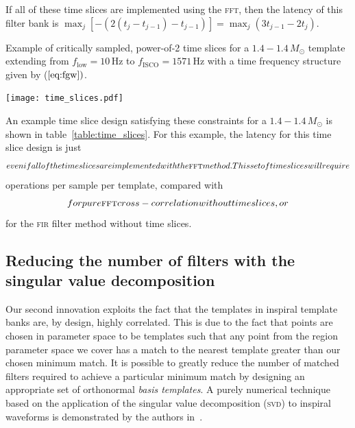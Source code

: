 If all of these time slices are implemented using the \textsc{fft}, then the
latency of this filter bank is $\max_j {\left[-\left( 2(t_j - t_{j-1}) -
t_{j-1} \right)\right]} = \max_j \left( 3 t_{j-1} - 2 t_j \right)$.

\begin{table}[h!]
\caption{Example of critically sampled, power-of-2 time slices for a $1.4 - 1.4
\, M_{\odot}$ template extending from $f_\mathrm{low} = 10 \, \mathrm{Hz}$ to
$f_\mathrm{ISCO} = 1571\, \mathrm{Hz}$ with a time frequency structure given by
($\ref{eq:fgw})$.}
\label{table:time_slices}
\begin{minipage}[c]{0.5\textwidth}
\centering
\texttt{[image: time\_slices.pdf]}
\end{minipage}
\begin{minipage}[c]{0.3\textwidth}
\centering

\end{minipage}
\end{table}

An example time slice design satisfying these constraints for a $1.4 - 1.4 \,
M_{\odot}$ is shown in table~\ref{table:time_slices}.  For this example, the
latency for this time slice design is just $$
even if all of the time slices are implemented with the \textsc{fft} method.
This set of time slices will require $$
operations per sample per template, compared with
$$ for pure \textsc{fft} cross-correlation
without time slices, or $$ for the \textsc{fir}
filter method without time slices.

\subsection{Reducing the number of filters with the singular value decomposition}

Our second innovation exploits the fact that the templates in inspiral template
banks are, by design, highly correlated.  This is due to the fact that points
are chosen in parameter space to be templates such that any point from the
region parameter space we cover has a match to the nearest template greater
than our chosen minimum match. It is possible to greatly reduce the number of
matched filters required to achieve a particular minimum match by designing an
appropriate set of orthonormal {\em basis templates}.  A purely numerical
technique based on the application of the singular value decomposition
(\textsc{svd}) to inspiral waveforms is demonstrated by the authors
in~\cite{Cannon:2010p10398}.

